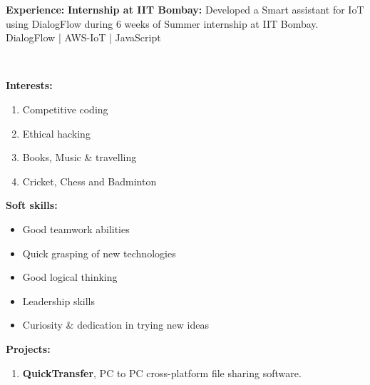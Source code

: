 \documentclass[a4paper,11pt]{article}
\begin{document}
\begin{center}
\begin{minipage}[t]{0.35\textwidth}
            \begin{LARGE}
				\textbf{Experience:}\medskip%
				{\small
					\vspace{0.2cm}
					\newline
					\textbf{Internship at IIT Bombay:}
					\newline
					Developed a Smart assistant for IoT using DialogFlow during 6 weeks of Summer internship at IIT Bombay.
					\medskip
					\\DialogFlow | AWS-IoT | JavaScript
				}
			\end{LARGE}
			\\\vspace{0.7cm}
            \begin{LARGE}
				\textbf{Interests:}\smallskip%
				{\small
					\begin{enumerate}[leftmargin=*,label=-]
						\item Competitive coding
						\item Ethical hacking
						\item Books, Music \& travelling
						\item Cricket, Chess and Badminton
					\end{enumerate}
				}
			\end{LARGE}
			\vspace{0.55cm}
			\begin{LARGE}
				\textbf{Soft skills:}\smallskip%
				{\small
					\begin{itemize}[leftmargin=*]
						\item Good teamwork abilities
						\item Quick grasping of new technologies
						\item Good logical thinking
						\item Leadership skills
						\item Curiosity \& dedication in trying new ideas
					\end{itemize}
				}
			\end{LARGE}
		\end{minipage}%
		\hspace{0.6cm}
		\begin{minipage}[t]{0.6\textwidth}
			\raggedright\smallskip
			\begin{LARGE}
				\textbf{Projects:}\medskip%
				{\small
					\begin{enumerate}
						\item \textbf{QuickTransfer}, PC to PC cross-platform file sharing software.\linebreak

\end{enumerate}}
\end{LARGE}
\end{minipage}
\end{center}
\end{document}
